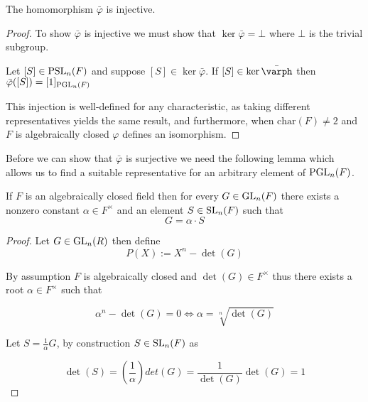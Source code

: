 \begin{lemma}
\label{Injective_PSL_monoidHom_PGL}
\leanok
    The homomorphism $\bar{\varphi}$ is injective.
\end{lemma}


\begin{proof}

To show $\bar{\varphi}$ is injective we must show that $\ker \bar{\varphi} = \bot$ where $\bot$ is the trivial subgroup.

Let $[S] \in \operatorname{PSL}_n(F)$ and suppose $[S] \in \ker \bar{\varphi}$. If $[S] \in \ker \bar{\varph}$ then $\bar{\varphi} ([S]) = [1]_{\operatorname{PGL}_n(F)}$ 


This injection is well-defined for any characteristic, as taking different representatives yields the same result, and furthermore, when $\textrm{char}(F) \ne 2$ and $F$ is algebraically closed $\varphi$ defines an isomorphism.

\end{proof}

Before we can show that $\bar{\varphi}$ is surjective we need the following lemma which allows us to find a suitable representative for an arbitrary element of $\operatorname{PGL}_n(F)$.

\begin{lemma}
\label{exists_SL_eq_scaled_GL_of_IsAlgClosed}
\leanok
If $F$ is an algebraically closed field then for every $G \in \operatorname{GL}_n(F)$ there exists a nonzero constant $\alpha \in F^\times$ and an element $S \in \operatorname{SL}_n(F)$ such that 
\begin{equation*}
    G = \alpha \cdot S
\end{equation*}
\end{lemma}

\begin{proof}
Let $G \in \operatorname{GL}_n(R)$ then define
\begin{equation*}
    P(X) := X^n - \det(G)
\end{equation*}

By assumption $F$ is algebraically closed and $\det(G) \in F^\times$ thus there exists a root $\alpha \in F^\times$ such that 

\begin{equation*}
    \alpha^n - \det(G) = 0 \iff \alpha = \sqrt[n]{\det(G)} 
\end{equation*}

Let $S = \frac{1}{\alpha} G$, by construction $S \in \operatorname{SL}_n(F)$ as 

\begin{equation*}
    \det(S) = (\frac{1}{\alpha})det(G) = \frac{1}{\det(G)} \det(G) = 1
\end{equation*}
\end{proof}

